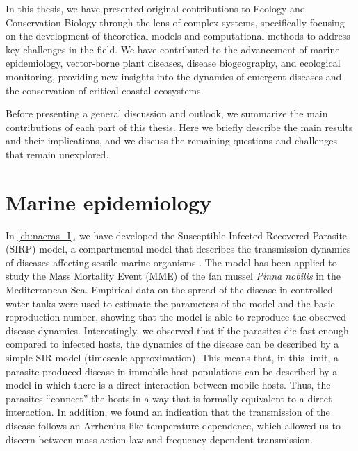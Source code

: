 
In this thesis, we have presented original contributions to Ecology
and Conservation Biology through the lens of complex systems, specifically
focusing on the development of theoretical models and computational
methods to address key challenges in the field. We have contributed to the
advancement of marine epidemiology, vector-borne plant diseases, disease
biogeography, and ecological monitoring, providing new insights into the
dynamics of emergent diseases and the conservation of critical coastal
ecosystems.

Before presenting a general discussion and outlook, we summarize the main
contributions of each part of this thesis. Here we briefly describe the main
results and their implications, and we discuss the remaining questions and
challenges that remain unexplored.

\section{Marine epidemiology}

In \cref{ch:nacras_I}, we have developed the
Susceptible-Infected-Recovered-Parasite (SIRP) model, a compartmental model
that describes the transmission dynamics of diseases affecting sessile marine
organisms \cite{GimenezRomero2021}. The model has been applied to
study the Mass Mortality Event (MME) of the fan mussel \textit{Pinna nobilis}
in the Mediterranean Sea. Empirical data on the spread of the disease in
controlled water tanks were used to estimate the parameters of the model and
the basic reproduction number, showing that the model is able to reproduce the
observed disease dynamics. Interestingly, we observed that if the parasites
die fast enough compared to infected hosts, the dynamics of the disease can
be described by a simple SIR model (timescale approximation). This means that,
in this limit, a parasite-produced disease in immobile host populations can be
described by a model in which there is a direct interaction between mobile
hosts. Thus, the parasites ``connect'' the hosts in a way that is formally
equivalent to a direct interaction. In addition, we found an indication that
the transmission of the disease follows an Arrhenius-like temperature
dependence, which allowed us to discern between mass action law and
frequency-dependent transmission.

